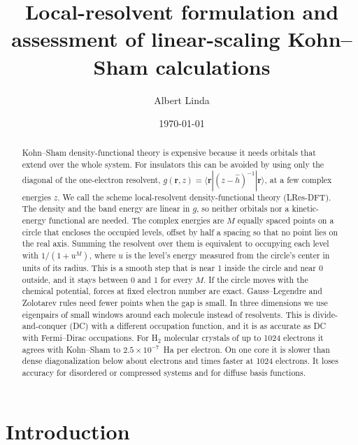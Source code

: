 \documentclass[aps,prb,twocolumn,superscriptaddress,floatfix,longbibliography]{revtex4-2}
\theoremstyle{remark}
\begin{document}
\title{Local-resolvent formulation and assessment of linear-scaling Kohn--Sham calculations}

\author{Albert Linda}

\date{\today}

\begin{abstract}
Kohn--Sham density-functional theory is expensive because it needs orbitals that extend over the whole system. For
insulators this can be avoided by using only the diagonal of the one-electron resolvent,
$g(\bm r,z)=\langle\bm r|(z-\hat h)^{-1}|\bm r\rangle$, at a few complex energies $z$. We call the scheme local-resolvent
density-functional theory (LRes-DFT). The density and the band energy are linear in $g$, so neither orbitals nor a
kinetic-energy functional are needed. The complex energies are $M$ equally spaced points on a circle that encloses the occupied levels, offset by half a spacing so
that no point lies on the real axis. Summing the resolvent over them is equivalent to occupying each level with
$1/(1+u^M)$, where $u$ is the level's energy measured from the circle's center in units of its radius. This is a smooth step
that is near 1 inside the circle and near 0 outside, and it stays between 0 and 1 for every $M$. If the circle moves with the
chemical potential, forces at fixed electron number are exact. Gauss--Legendre and Zolotarev rules need fewer points when
the gap is small. In three dimensions we use eigenpairs of small windows around each molecule instead of resolvents. This is
divide-and-conquer (DC) with a different occupation function, and it is as accurate as DC with Fermi--Dirac occupations. For
H$_2$ molecular crystals of up to 1024 electrons it agrees with Kohn--Sham to $2.5\times10^{-7}$~Ha per electron. On one
core it is slower than dense diagonalization below about  electrons and
 times faster at 1024 electrons. It loses accuracy for disordered or compressed systems and
for diffuse basis functions.
\end{abstract}

\maketitle

\section{Introduction}
\end{document}
